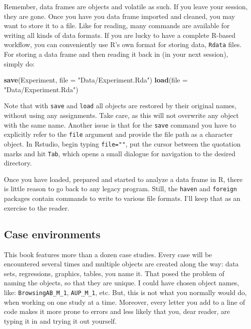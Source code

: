 \documentclass[]{svmono}
\newenvironment{Shaded}{\begin{snugshade}}{\end{snugshade}}
\newcommand{\KeywordTok}[1]{\textcolor[rgb]{0.13,0.29,0.53}{\textbf{#1}}}
\newcommand{\DataTypeTok}[1]{\textcolor[rgb]{0.13,0.29,0.53}{#1}}
\newcommand{\StringTok}[1]{\textcolor[rgb]{0.31,0.60,0.02}{#1}}
\newcommand{\NormalTok}[1]{#1}
\theoremstyle{definition}
\theoremstyle{definition}
\theoremstyle{definition}
\theoremstyle{remark}
\begin{document}
Remember, data frames are objects and volatile as such. If you leave
your session, they are gone. Once you have you data frame imported and
cleaned, you may want to store it to a file. Like for reading, many
commands are available for writing all kinds of data formats. If you are
lucky to have a complete R-based workflow, you can conveniently use R's
own format for storing data, \texttt{Rdata} files. For storing a data
frame and then reading it back in (in your next session), simply do:

\begin{Shaded}
\begin{Highlighting}[]
\KeywordTok{save}\NormalTok{(Experiment, }\DataTypeTok{file =} \StringTok{"Data/Experiment.Rda"}\NormalTok{)}
\KeywordTok{load}\NormalTok{(}\DataTypeTok{file =} \StringTok{"Data/Experiment.Rda"}\NormalTok{)}
\end{Highlighting}
\end{Shaded}

Note that with \texttt{save} and \texttt{load} all objects are restored
by their original names, without using any assignments. Take care, as
this will not overwrite any object with the same name. Another issue is
that for the \texttt{save} command you have to explicitly refer to the
\texttt{file} argument and provide the file path as a character object.
In Rstudio, begin typing \texttt{file=""}, put the cursor between the
quotation marks and hit \texttt{Tab}, which opens a small dialogue for
navigation to the desired directory.

Once you have loaded, prepared and started to analyze a data frame in R,
there is little reason to go back to any legacy program. Still, the
\texttt{haven} and \texttt{foreign} packages contain commands to write
to various file formats. I'll keep that as an exercise to the reader.

\subsection{Case environments}\label{case-environments}

This book features more than a dozen case studies. Every case will be
encountered several times and multiple objects are created along the
way: data sets, regressions, graphics, tables, you name it. That posed
the problem of naming the objects, so that they are unique. I could have
chosen object names, like: \texttt{BrowsingAB\_M\_1},
\texttt{AUP\_M\_1}, etc. But, this is not what you normally would do,
when working on one study at a time. Moreover, every letter you add to a
line of code makes it more prone to errors and less likely that you,
dear reader, are typing it in and trying it out yourself.
\end{document}
